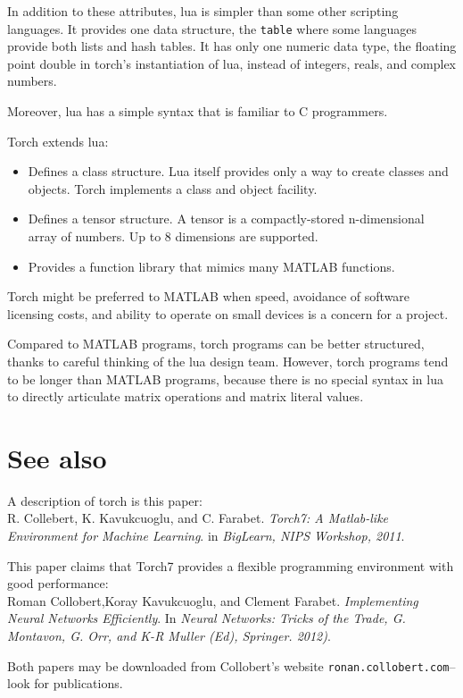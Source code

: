 \documentclass{article}
\let\code\texttt %
\begin{document}
In addition to these attributes, lua is simpler than some other
scripting languages. It provides one data structure, the \code{table}
where some languages provide both lists and hash tables. It has only one
numeric data type, the floating point double in torch's instantiation of
lua, instead of integers, reals, and complex numbers.

Moreover, lua has a simple syntax that is familiar to C programmers.

Torch extends lua:
\begin{itemize}
  \item Defines a class structure. Lua itself provides only a way to
    create classes and objects. Torch implements a class and object
    facility.
  \item Defines a tensor structure. A tensor is a compactly-stored
    n-dimensional array
    of numbers. Up to 8 dimensions are supported.
  \item Provides a function library that mimics many MATLAB functions. 
\end{itemize}


Torch might be preferred to MATLAB when speed, avoidance of software
licensing costs, and ability to operate on small devices is a concern
for a project. 

Compared to MATLAB programs, torch programs can be better structured,
thanks to careful thinking of the lua design team. However, torch
programs tend to be longer than MATLAB programs, because there is no
special syntax in lua to directly articulate matrix operations and
matrix literal values.




\section{See also}

A description of torch is this paper:\\
R. Collebert, K. Kavukcuoglu, and C. Farabet. \emph{Torch7: A
Matlab-like Environment for Machine Learning}. in \emph{BigLearn, NIPS
Workshop, 2011}.

This paper claims that Torch7 provides a flexible programming
environment with good performance:\\
Roman Collobert,Koray Kavukcuoglu, and Clement Farabet.
\emph{Implementing Neural Networks Efficiently}. In \emph{Neural
  Networks: Tricks of the Trade, G. Montavon, G. Orr, and K-R Muller
(Ed), Springer. 2012)}.

Both papers may be downloaded from Collobert's website
\code{ronan.collobert.com}--look for publications.
\end{document}
